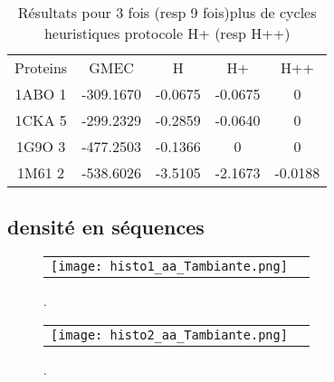     \begin{table}[h]
      \centering

      \begin{tabular}{ccccc}

        \toprule
        Proteins & GMEC & H & H+ & H++ \\
        \cmidrule{1-5}
        1ABO 1 & -309.1670 & -0.0675 & -0.0675 & 0 \\
        1CKA 5 & -299.2329 & -0.2859 & -0.0640 & 0 \\
        1G9O 3 & -477.2503 & -0.1366 & 0 & 0 \\
        1M61 2 & -538.6026 & -3.5105 & -2.1673 & -0.0188 \\
        \toprule


 \end{tabular}      
 \caption{Résultats pour 3 fois (resp 9 fois)plus de cycles heuristiques protocole H+ (resp H++)}
\label{tab:H+_H++}       
\end{table}


    \clearpage

   \subsection{densité en séquences }

    \begin{figure}[h]
      \centering
      \begin{tabular}{cc} 
        \texttt{[image: histo1\_aa\_Tambiante.png]} &
      \end{tabular}
      
      \caption{.}
\label{graph:densité_en_séquences1}
    \end{figure}


    \begin{figure}[h]
      \centering
      \begin{tabular}{cc} 
        \texttt{[image: histo2\_aa\_Tambiante.png]} &
      \end{tabular}
      
      \caption{.}
\label{graph:densité_en_séquences2}
    \end{figure}

    \clearpage




